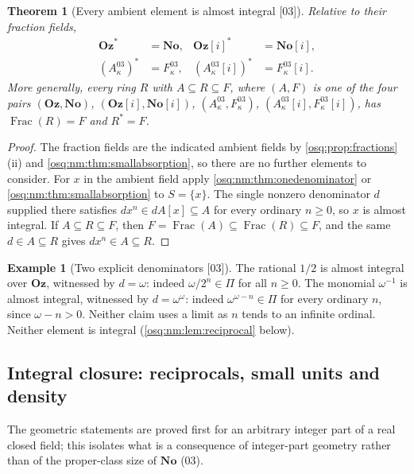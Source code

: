 \documentclass[11pt,letterpaper]{article}
\numberwithin{equation}{section}
\newtheorem{theorem}{Theorem}[section]
\theoremstyle{definition}
\newtheorem{example}[example]{Example}
\theoremstyle{remark}
\theoremstyle{plain}
\newcommand{\No}{\mathbf{No}}
\newcommand{\Oz}{\mathbf{Oz}}
\newcommand{\SC}{\No[i]}
\newcommand{\GOz}{\Oz[i]}
\newcommand{\Frac}{\operatorname{Frac}}
\newcommand{\src}[1]{\textup{\textsf{[#1]}}}
\begin{document}
\begin{theorem}[Every ambient element is almost integral \src{03}]\label{osq:nm:thm:complete}
Relative to their fraction fields,
\begin{align}
 \Oz^*&=\No,& \GOz^*&=\SC,\label{osq:nm:eq:fullcic}\\
 (A^{03}_\kappa)^*&=F^{03}_\kappa,& (A^{03}_\kappa[i])^*&=F^{03}_\kappa[i].\label{osq:nm:eq:localcic}
\end{align}
More generally, every ring $R$ with $A\subseteq R\subseteq F$, where $(A,F)$ is one of
the four pairs $(\Oz,\No)$, $(\GOz,\SC)$, $(A^{03}_\kappa,F^{03}_\kappa)$,
$(A^{03}_\kappa[i],F^{03}_\kappa[i])$, has $\Frac(R)=F$ and $R^*=F$.
\end{theorem}

\begin{proof}
The fraction fields are the indicated ambient fields by \cref{osq:prop:fractions}(ii) and
\cref{osq:nm:thm:smallabsorption}, so there are no further elements to consider. For $x$
in the ambient field apply \cref{osq:nm:thm:onedenominator} or
\cref{osq:nm:thm:smallabsorption} to $S=\{x\}$. The single nonzero denominator $d$
supplied there satisfies $dx^n\in dA[x]\subseteq A$ for every ordinary $n\ge0$, so $x$ is
almost integral. If $A\subseteq R\subseteq F$, then $F=\Frac(A)\subseteq\Frac(R)\subseteq
F$, and the same $d\in A\subseteq R$ gives $dx^n\in A\subseteq R$.
\end{proof}

\begin{example}[Two explicit denominators \src{03}]\label{osq:nm:ex:almost}
The rational $1/2$ is almost integral over $\Oz$, witnessed by $d=\omega$: indeed
$\omega/2^n\in\Pi$ for all $n\ge0$. The monomial $\omega^{-1}$ is almost integral,
witnessed by $d=\omega^\omega$: indeed $\omega^{\omega-n}\in\Pi$ for every ordinary $n$,
since $\omega-n>0$. Neither claim uses a limit as $n$ tends to an infinite ordinal.
Neither element is integral (\cref{osq:nm:lem:reciprocal} below).
\end{example}

\subsection{Integral closure: reciprocals, small units and density}\label{osq:nm:sub:integral}

The geometric statements are proved first for an arbitrary integer part of a real closed
field; this isolates what is a consequence of integer-part geometry rather than of the
proper-class size of $\No$ (03).
\end{document}
